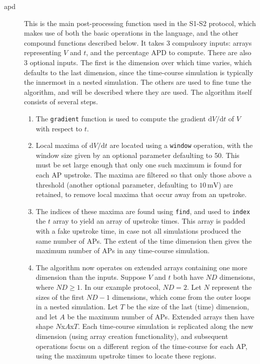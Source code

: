 \documentclass[preprint,authoryear,12pt]{elsarticle}
\newcommand{\code}[1]{\texttt{#1}}
\newcommand{\vu}[2]{\ensuremath{#1\,\mathrm{#2}}}
\newcommand{\ud}{\mathrm{d}}
\newcommand{\dd}[2]{{\ud #1}/{\ud #2}}
\begin{document}
\begin{description}
\item[apd]
  This is the main post-processing function used in the S1-S2 protocol, which makes use of both the basic operations in the language, and the other compound functions described below.
  It takes 3 compulsory inputs: arrays representing $V$ and $t$, and the percentage APD to compute.
  There are also 3 optional inputs.
  The first is the dimension over which time varies, which defaults to the last dimension, since the time-course simulation is typically the innermost in a nested simulation.
  The others are used to fine tune the algorithm, and will be described where they are used.
  The algorithm itself consists of several steps.
  \begin{enumerate}
  \item
    The \code{gradient} function is used to compute the gradient $\dd{V}{t}$ of $V$ with respect to $t$.
  \item
    Local maxima of $\dd{V}{t}$ are located using a \code{window} operation, with the window size given by an optional parameter defaulting to 50.
    This must be set large enough that only one such maximum is found for each AP upstroke.
    The maxima are filtered so that only those above a threshold (another optional parameter, defaulting to \vu{10}{mV}) are retained, to remove local maxima that occur away from an upstroke.
  \item
    The indices of these maxima are found using \code{find}, and used to \code{index} the $t$ array to yield an array of upstroke times.
    This array is padded with a fake upstroke time, in case not all simulations produced the same number of APs.
    The extent of the time dimension then gives the maximum number of APs in any time-course simulation.
  \item
    The algorithm now operates on extended arrays containing one more dimension than the inputs.
    Suppose $V$ and $t$ both have $\mathit{ND}$ dimensions, where $\mathit{ND} \geq 1$.
    In our example protocol, $\mathit{ND}=2$.
    Let $N$ represent the sizes of the first $\mathit{ND}-1$ dimensions, which come from the outer loops in a nested simulation.
    Let $T$ be the size of the last (time) dimension, and let $A$ be the maximum number of APs.
    Extended arrays then have shape $N$x$A$x$T$.
    Each time-course simulation is replicated along the new dimension (using array creation functionality), and subsequent operations focus on a different region of the time-course for each AP, using the maximum upstroke times to locate these regions.

\end{enumerate}
\end{description}
\end{document}
